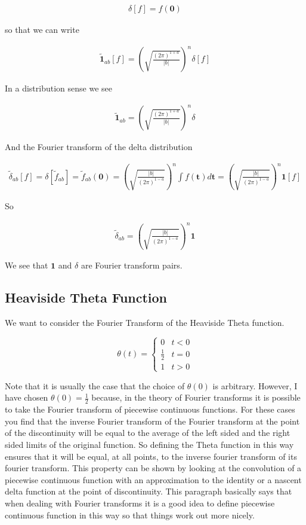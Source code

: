 \documentclass[12pt]{article}
\newcommand{\bv}[1]{\boldsymbol{#1}}
\begin{document}
\begin{align}
\delta[f] = f(\bv{0})
\end{align}

so that we can write

\begin{align}
\tilde{\mathbf{1}}_{ab}[f] = \left(\sqrt{\frac{(2\pi)^{1+a}}{|b|}}\right)^n \delta[f]
\end{align}

In a distribution sense we see

\begin{align}
\tilde{\mathbf{1}}_{ab} =  \left(\sqrt{\frac{(2\pi)^{1+a}}{|b|}}\right)^n \delta
\end{align}

And the Fourier transform of the delta distribution

\begin{align}
\tilde{\delta}_{ab}[f] = \delta[\tilde{f}_{ab}] = \tilde{f}_{ab}(\bv{0}) = \left(\sqrt{\frac{|b|}{(2\pi)^{1-a}}}\right)^n \int f(\bv{t}) d\bv{t} = \left(\sqrt{\frac{|b|}{(2\pi)^{1-a}}}\right)^n \mathbf{1}[f]
\end{align}

So

\begin{align}
\tilde{\delta}_{ab} = \left(\sqrt{\frac{|b|}{(2\pi)^{1-a}}}\right)^n \mathbf{1}
\end{align}

We see that $\mathbf{1}$ and $\delta$ are Fourier transform pairs.

\subsection{Heaviside Theta Function}

We want to consider the Fourier Transform of the Heaviside Theta function.  

\[ \theta(t) = \begin{cases} 
      0 & t < 0 \\
      \frac{1}{2} & t=0\\
      1 & t > 0 
   \end{cases}
\]

Note that it is usually the case that the choice of $\theta(0)$ is arbitrary. However, I have chosen $\theta(0) = \frac{1}{2}$ because, in the theory of Fourier transforms it is possible to take the Fourier transform of piecewise continuous functions. For these cases you find that the inverse Fourier transform of the Fourier transform at the point of the discontinuity will be equal to the average of the left sided and the right sided limits of the original function. So defining the Theta function in this way ensures that it will be equal, at all points, to the inverse fourier transform of its fourier transform. This property can be shown by looking at the convolution of a piecewise continuous function with an approximation to the identity or a nascent delta function at the point of discontinuity. This paragraph basically says that when dealing with Fourier transforms it is a good idea to define piecewise continuous function in this way so that things work out more nicely.
\end{document}
